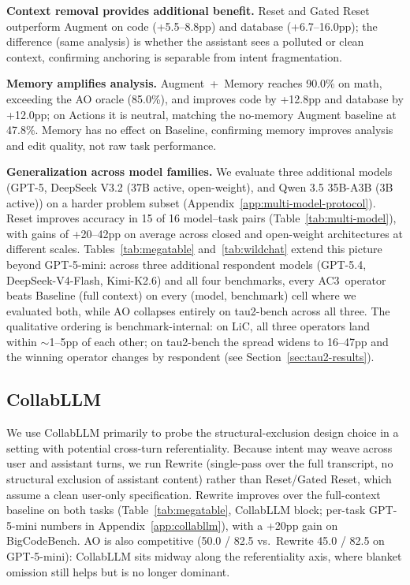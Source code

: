 \documentclass{article}
\newcommand{\method}{AC3\xspace}
\begin{document}
\noindent\textbf{Context removal provides additional benefit.}
Reset and Gated Reset outperform Augment on code (+5.5--8.8pp) and database (+6.7--16.0pp); the difference (same analysis) is whether the assistant sees a polluted or clean context, confirming anchoring is separable from intent fragmentation.

\noindent\textbf{Memory amplifies analysis.}
Augment~+~Memory reaches 90.0\% on math, exceeding the AO oracle (85.0\%), and improves code by +12.8pp and database by +12.0pp; on Actions it is neutral, matching the no-memory Augment baseline at 47.8\%. Memory has no effect on Baseline, confirming memory improves analysis and edit quality, not raw task performance.

\noindent\textbf{Generalization across model families.}
\label{sec:multi-model}
We evaluate three additional models (GPT-5, DeepSeek V3.2 (37B active, open-weight), and Qwen 3.5 35B-A3B (3B active)) on a harder problem subset (Appendix~\ref{app:multi-model-protocol}). Reset improves accuracy in 15 of 16 model--task pairs (Table~\ref{tab:multi-model}), with gains of +20--42pp on average across closed and open-weight architectures at different scales. Tables~\ref{tab:megatable} and~\ref{tab:wildchat} extend this picture beyond GPT-5-mini: across three additional respondent models (GPT-5.4, DeepSeek-V4-Flash, Kimi-K2.6) and all four benchmarks, every \method~operator beats Baseline (full context) on every (model, benchmark) cell where we evaluated both, while AO collapses entirely on tau2-bench across all three. The qualitative ordering is benchmark-internal: on LiC, all three operators land within $\sim$1--5pp of each other; on tau2-bench the spread widens to 16--47pp and the winning operator changes by respondent (see Section~\ref{sec:tau2-results}).


\subsection{CollabLLM}
\label{sec:collab-results}

We use CollabLLM primarily to probe the structural-exclusion design choice in a setting with potential cross-turn referentiality. Because intent may weave across user and assistant turns, we run Rewrite (single-pass over the full transcript, no structural exclusion of assistant content) rather than Reset/Gated Reset, which assume a clean user-only specification. Rewrite improves over the full-context baseline on both tasks (Table~\ref{tab:megatable}, CollabLLM block; per-task GPT-5-mini numbers in Appendix~\ref{app:collabllm}), with a +20pp gain on BigCodeBench. AO is also competitive (50.0 / 82.5 vs.\ Rewrite 45.0 / 82.5 on GPT-5-mini): CollabLLM sits midway along the referentiality axis, where blanket omission still helps but is no longer dominant.
\end{document}
